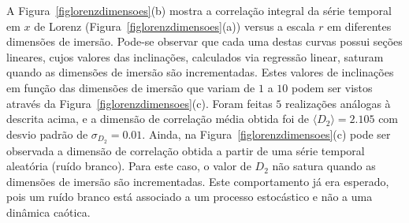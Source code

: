 A Figura~\ref{figlorenzdimensoes}(b) mostra a correlação integral da série temporal em $x$ de Lorenz (Figura~\ref{figlorenzdimensoes}(a)) versus a escala $r$ em diferentes dimensões de imersão. Pode-se observar que cada uma destas curvas possui seções lineares, cujos valores das inclinações, calculados via regressão linear, saturam quando as dimensões de imersão são incrementadas. Estes valores de inclinações em função das dimensões de imersão que variam de $1$ a $10$ podem ser vistos através da Figura~\ref{figlorenzdimensoes}(c). Foram feitas $5$ realizações análogas à descrita acima, e a dimensão de correlação média obtida foi de $\langle D_{2}\rangle=2.105$ com desvio padrão de $\sigma_{D_{2}}=0.01$. Ainda, na Figura~\ref{figlorenzdimensoes}(c) pode ser observada a dimensão de correlação obtida a partir de uma série temporal aleatória (ruído branco). Para este caso, o valor de $D_{2}$ não satura quando as dimensões de imersão são incrementadas. Este comportamento já era esperado, pois um ruído branco está associado a um processo estocástico e não a uma dinâmica caótica.

